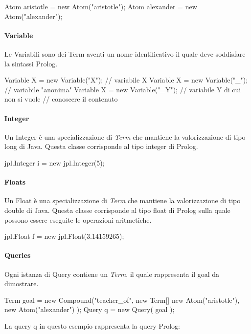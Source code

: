 \begin{javacode}
Atom aristotle = new Atom("aristotle");
Atom alexander = new Atom("alexander");
\end{javacode}

\paragraph{Variable}
Le Variabili sono dei Term aventi un nome identificativo il quale deve soddisfare la sintassi Prolog.

\begin{javacode}
Variable X = new Variable("X");  //  variabile X
Variable X = new Variable("_");  //  variabile "anonima"
Variable X = new Variable("_Y"); // variabile Y di cui non si vuole 
				 // conoscere il contenuto
\end{javacode}

\paragraph{Integer}
Un Integer è una specializzazione di \emph{Term} che mantiene la valorizzazione di tipo long di Java. Questa classe corrisponde al tipo integer di Prolog.

\begin{javacode}
jpl.Integer i = new jpl.Integer(5);
\end{javacode}

\paragraph{Floats}
Un Float è una specializzazione di \emph{Term} che mantiene la valorizzazione di tipo double di Java. Questa classe corrisponde al tipo float di Prolog sulla quale possono essere eseguite le operazioni aritmetiche.

\begin{javacode}
  jpl.Float f = new jpl.Float(3.14159265);
\end{javacode}

\paragraph{Queries}
Ogni istanza di Query contiene un \emph{Term}, il quale rappresenta il goal da dimostrare.

\begin{javacode}
	Term goal = new Compound("teacher_of",
	new Term[] {
		new Atom("aristotle"),
		new Atom("alexander")
	}
	);
  Query q = new Query( goal );
\end{javacode}
La query q in questo esempio rappresenta la query Prolog:


